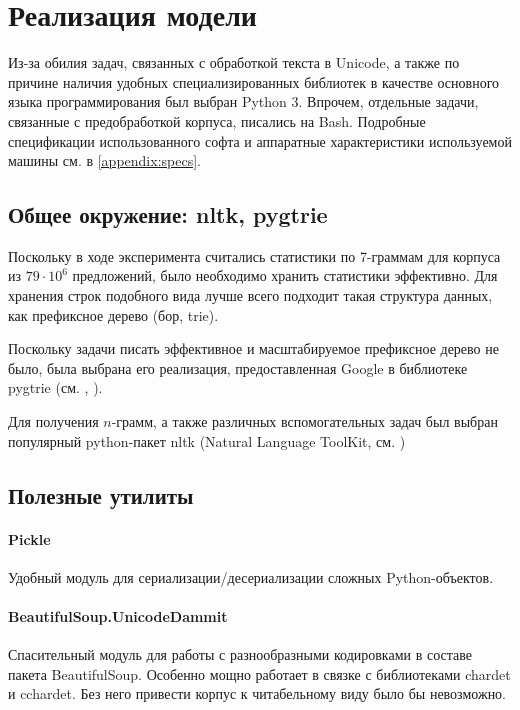 
\section{ Реализация модели }\label{sec:coding}

Из-за обилия задач, связанных с обработкой текста в Unicode, а также по причине наличия удобных специализированных библиотек в качестве основного языка программирования был выбран Python 3. Впрочем, отдельные задачи, связанные с предобработкой корпуса, писались на Bash. Подробные спецификации использованного софта и аппаратные характеристики используемой машины см. в \cref{appendix:specs}.

\subsection{ Общее окружение: nltk, pygtrie }

Поскольку в ходе эксперимента считались статистики по 7-граммам для корпуса из $79 \cdot 10^6$ предложений, было необходимо хранить статистики эффективно. Для хранения строк подобного вида лучше всего подходит такая структура данных, как префиксное дерево (бор, trie).

Поскольку задачи писать эффективное и масштабируемое префиксное дерево не было, была выбрана его реализация, предоставленная Google в библиотеке pygtrie (см. \cite{python:pygtrie}, \cite{python:pygtrierepo}).

Для получения $n$-грамм, а также различных вспомогательных задач был выбран популярный python-пакет nltk (Natural Language ToolKit, см. \cite{python:nltk})

\subsection{ Полезные утилиты }

\paragraph{ Pickle } Удобный модуль для сериализации/десериализации сложных Python-объектов.

\paragraph{ BeautifulSoup.UnicodeDammit } Спасительный модуль для работы с разнообразными кодировками в составе пакета BeautifulSoup. Особенно мощно работает в связке с библиотеками chardet и cchardet. Без него привести корпус к читабельному виду было бы невозможно.

